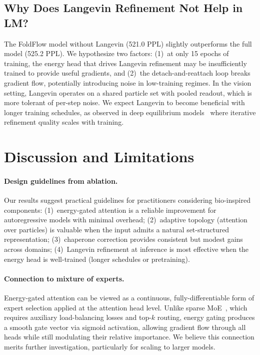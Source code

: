 \documentclass[10pt]{article}
\begin{document}
\subsection{Why Does Langevin Refinement Not Help in LM?}

The FoldFlow model without Langevin (521.0 PPL) slightly outperforms
the full model (525.2 PPL).  We hypothesize two factors: (1)~at only
15 epochs of training, the energy head that drives Langevin refinement
may be insufficiently trained to provide useful gradients, and (2)~the
detach-and-reattach loop breaks gradient flow, potentially introducing
noise in low-training regimes.  In the vision setting, Langevin
operates on a shared particle set with pooled readout, which is more
tolerant of per-step noise.  We expect Langevin to become beneficial
with longer training schedules, as observed in deep equilibrium
models~\citep{bai2019deep} where iterative refinement quality scales
with training.

\section{Discussion and Limitations}
\label{sec:discussion}

\paragraph{Design guidelines from ablation.}
Our results suggest practical guidelines for practitioners considering
bio-inspired components: (1)~energy-gated attention is a reliable
improvement for autoregressive models with minimal overhead;
(2)~adaptive topology (attention over particles) is valuable when the
input admits a natural set-structured representation; (3)~chaperone
correction provides consistent but modest gains across domains;
(4)~Langevin refinement at inference is most effective when the energy
head is well-trained (longer schedules or pretraining).

\paragraph{Connection to mixture of experts.}
Energy-gated attention can be viewed as a continuous, fully-differentiable
form of expert selection applied at the attention head level.  Unlike
sparse MoE~\citep{fedus2022switch}, which requires auxiliary load-balancing
losses and top-$k$ routing, energy gating produces a smooth gate vector via
sigmoid activation, allowing gradient flow through all heads while still
modulating their relative importance.  We believe this connection merits
further investigation, particularly for scaling to larger models.
\end{document}
